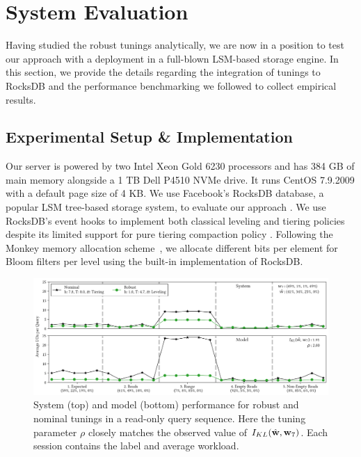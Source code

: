 
\section{System Evaluation}
\label{sec:system-evaluation}

Having studied the robust tunings analytically, we are now in a position to test
    our approach with a deployment in a full-blown LSM-based storage engine.
In this section, we provide the details regarding the integration of {\Endure}
    tunings to RocksDB and the performance benchmarking we followed to collect
    empirical results.

\subsection{Experimental Setup \& Implementation}

Our server is powered by two Intel Xeon Gold 6230 processors and has 384 GB 
    of main memory alongside a 1 TB Dell P4510 NVMe drive.
It runs CentOS 7.9.2009 with a default page size of 4 KB.
We use Facebook's RocksDB database, a popular LSM tree-based storage system, to
    evaluate our approach \cite{FacebookMyRocks}.
We use RocksDB's event hooks to implement both classical leveling and tiering
    policies despite its limited support for pure tiering compaction policy
    \cite{RocksDB2020a}.
Following the Monkey memory allocation scheme~\cite{Dayan2017}, we allocate different
    bits per element for Bloom filters per level using the built-in 
    implementation of RocksDB.

\begin{figure}[ht]
    \centering
    \includegraphics[scale=0.5]{figures/query_seq_read_2.pdf}
    \caption{System (top) and model (bottom) performance for robust and nominal
        tunings in a read-only query sequence. Here the tuning parameter $\rho$
        closely matches the observed value of $I_{KL}({{\hat{\bf{w}}}},
        {{\bf{w}}}_{7})$.
    Each session contains the label and average workload.
    }
    \label{fig:query_seq_reads_2}
\end{figure}

